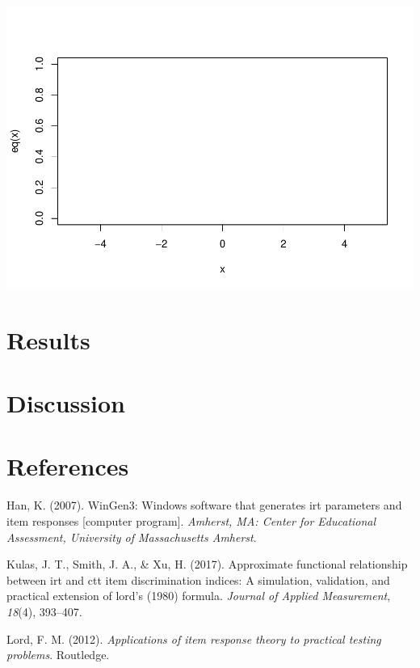 \documentclass[
  english,
  man,floatsintext]{apa6}
\begin{document}
\includegraphics{ICC_project_files/figure-latex/unnamed-chunk-4-1.pdf}

\hypertarget{results}{%
\section{Results}\label{results}}

\hypertarget{discussion}{%
\section{Discussion}\label{discussion}}

\newpage

\hypertarget{references}{%
\section{References}\label{references}}

\begingroup
\setlength{\parindent}{-0.5in}
\setlength{\leftskip}{0.5in}

\hypertarget{refs}{}
\leavevmode\hypertarget{ref-han2007wingen3}{}%
Han, K. (2007). WinGen3: Windows software that generates irt parameters and item responses {[}computer program{]}. \emph{Amherst, MA: Center for Educational Assessment, University of Massachusetts Amherst}.

\leavevmode\hypertarget{ref-kulas2017approximate}{}%
Kulas, J. T., Smith, J. A., \& Xu, H. (2017). Approximate functional relationship between irt and ctt item discrimination indices: A simulation, validation, and practical extension of lord's (1980) formula. \emph{Journal of Applied Measurement}, \emph{18}(4), 393--407.

\leavevmode\hypertarget{ref-lord2012applications}{}%
Lord, F. M. (2012). \emph{Applications of item response theory to practical testing problems}. Routledge.

\endgroup
\end{document}
